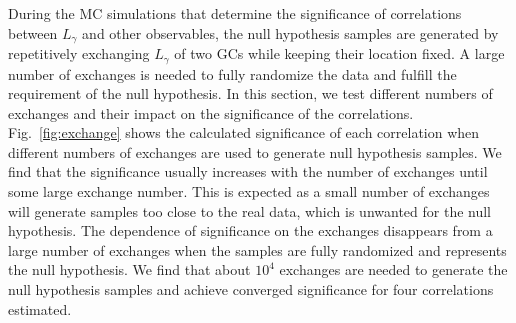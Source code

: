 \documentclass[doublespace,draft,nopageskip]{VTthesis} %
\begin{document}
\begin{appendices}
During the MC simulations that determine the significance of correlations between $L_\gamma$ and other observables, the null hypothesis samples are generated by repetitively exchanging $L_\gamma$ of two GCs while keeping their location fixed. A large number of exchanges is needed to fully randomize the data and fulfill the requirement of the null hypothesis. In this section, we test different numbers of exchanges and their impact on the significance of the correlations. Fig.~\ref{fig:exchange} shows the calculated significance of each correlation when different numbers of exchanges are used to generate null hypothesis samples. We find that the significance usually increases with the number of exchanges until some large exchange number. This is expected as a small number of exchanges will generate samples too close to the real data, which is unwanted for the null hypothesis. The dependence of significance on the exchanges disappears from a large number of exchanges when the samples are fully randomized and represents the null hypothesis. We find that about $10^4$ exchanges are needed to generate the null hypothesis samples and achieve converged significance for four correlations estimated.


\end{appendices}
\end{document}
